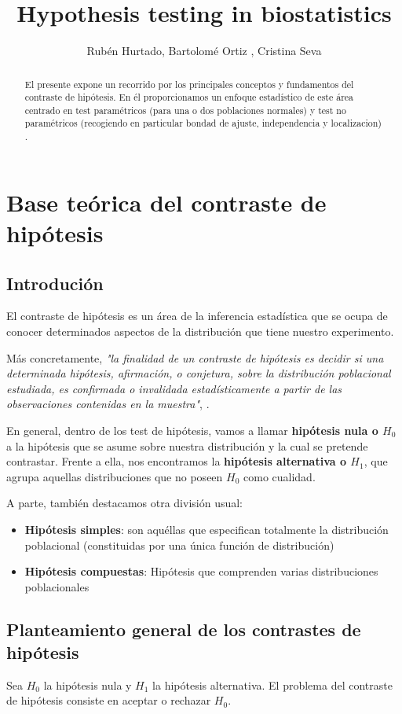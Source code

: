 \documentclass[a4paper,12pt]{article}
\title{Hypothesis testing in biostatistics}
\author{Rubén Hurtado, Bartolomé Ortiz , Cristina Seva }
\begin{document}
\maketitle

\begin{abstract}
El presente expone un recorrido por los principales conceptos y fundamentos del contraste de hipótesis. En él proporcionamos un enfoque estadístico de este área centrado en test paramétricos (para una o dos poblaciones normales) y test no paramétricos (recogiendo en particular bondad de ajuste, independencia y localizacion) . 
\end{abstract}


\section{Base teórica del contraste de hipótesis}
\subsection{Introdución}
El contraste de hipótesis es un área de la inferencia estadística que se ocupa de conocer determinados aspectos de la distribución que tiene nuestro experimento.

Más concretamente, \textit{"la finalidad de un contraste de hipótesis es decidir si una determinada hipótesis, afirmación, o conjetura, sobre la distribución poblacional estudiada, es confirmada o invalidada estadísticamente a partir de las observaciones contenidas en la muestra"}, \cite{velez1993principios}.

En general, dentro de los test de hipótesis, vamos a llamar \textbf{hipótesis nula o $H_0$} a la hipótesis que se asume sobre nuestra distribución y la cual se pretende contrastar. Frente a ella, nos encontramos la \textbf{hipótesis alternativa o $H_1$}, que agrupa aquellas distribuciones que no poseen $H_0$ como cualidad.

A parte, también destacamos otra división usual:
\begin{itemize}
	\item \textbf{Hipótesis simples}: son aquéllas que especifican totalmente la distribución poblacional (constituidas por una única función de distribución)
	\item \textbf{Hipótesis compuestas}: Hipótesis  que comprenden varias distribuciones poblacionales 
\end{itemize}

\subsection{Planteamiento general de los contrastes de hipótesis}
Sea $H_0$ la hipótesis nula y $H_1$ la hipótesis alternativa. El problema del contraste de hipótesis consiste en aceptar o rechazar $H_0$.
\end{document}
